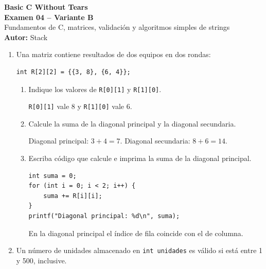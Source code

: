 
\newcommand{\NombreDocumento}{Examen 04 -- Variante B}

\begin{center}
    {\LARGE \textbf{Basic C Without Tears}} \\[0.2cm]
    {\Large \textbf{Examen 04 -- Variante B}} \\[0.12cm]
    \small Fundamentos de C, matrices, validación y algoritmos simples de strings \\[0.08cm]
    \textbf{Autor:} Stack
\end{center}
\vspace{0.2cm}
\begin{enumerate}[label=\textbf{\arabic*.}]
\item Una matriz contiene resultados de dos equipos en dos rondas:
\begin{lstlisting}[style=customc, numbers=none]
int R[2][2] = {{3, 8}, {6, 4}};
\end{lstlisting}
\begin{enumerate}[label=(\alph*)]
\item Indique los valores de \texttt{R[0][1]} y \texttt{R[1][0]}.
\ifpauta\begin{solucionbox}\texttt{R[0][1]} vale 8 y \texttt{R[1][0]} vale 6.\end{solucionbox}\else\vspace{1.5cm}\fi
\item Calcule la suma de la diagonal principal y la diagonal secundaria.
\ifpauta\begin{solucionbox}Diagonal principal: $3+4=7$. Diagonal secundaria: $8+6=14$.\end{solucionbox}\else\vspace{2cm}\fi
\item Escriba código que calcule e imprima la suma de la diagonal principal.
\ifpauta\begin{solucionbox}\begin{lstlisting}[style=customc]
int suma = 0;
for (int i = 0; i < 2; i++) {
    suma += R[i][i];
}
printf("Diagonal principal: %d\n", suma);
\end{lstlisting}En la diagonal principal el índice de fila coincide con el de columna.\end{solucionbox}\else\vspace{3cm}\fi
\end{enumerate}
\newpage
\item Un número de unidades almacenado en \texttt{int unidades} es válido si está entre 1 y 500, inclusive.

\end{enumerate}
